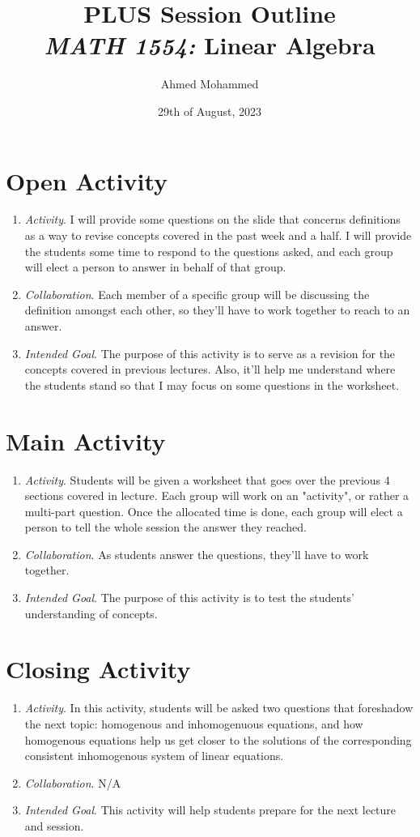 \documentclass[11pt]{article}
\title{\Large PLUS Session Outline \\ \normalsize \textit{MATH 1554:} Linear Algebra}
\author{Ahmed Mohammed}
\date{29th of August, 2023}
\begin{document}
\thispagestyle{fancy}
\section{\centering Open Activity}
	\begin{enumerate}
		\item \textit{Activity}. I will provide some questions on the slide that concerns definitions as a way to revise concepts covered in the past week and a half.
						I will provide the students some time to respond to the questions asked, and each group will elect a person to answer in behalf
						of that group.
		\item \textit{Collaboration}. Each member of a specific group will be discussing the definition amongst each other, so they'll have to work together
						to reach to an answer.
		\item \textit{Intended Goal}. The purpose of this activity is to serve as a revision for the concepts covered in previous lectures. Also, it'll help me
						understand where the students stand so that I may focus on some questions in the worksheet.
	\end{enumerate}

\section{\centering Main Activity}
	\begin{enumerate}
		\item \textit{Activity}. Students will be given a worksheet that goes over the previous 4 sections covered in lecture. Each group will work on an "activity",
						or rather a multi-part question. Once the allocated time is done, each group will elect a person to tell the whole session the answer
						they reached.
		\item \textit{Collaboration}. As students answer the questions, they'll have to work together. 
		\item \textit{Intended Goal}. The purpose of this activity is to test the students' understanding of concepts.
	\end{enumerate}

\section{\centering Closing Activity}
	\begin{enumerate}
		\item \textit{Activity}. In this activity, students will be asked two questions that foreshadow the next topic: homogenous and inhomogenuous equations,
			and how homogenous equations help us get closer to the solutions of the corresponding consistent inhomogenous system of linear equations.
		\item \textit{Collaboration}. \textsc{N/A}
		\item \textit{Intended Goal}. This activity will help students prepare for the next lecture and session.
	\end{enumerate}
\end{document}

